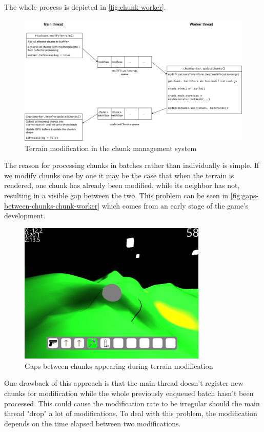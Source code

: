 The whole process is depicted in \autoref{fig:chunk-worker}.
\begin{figure}[h] %
    \centering
    \includegraphics[width=1\textwidth]{chapters/main_components/sections/chunk_worker/resources/chunkWorker.drawio.png}
    \caption{Terrain modification in the chunk management system}
    \label{fig:chunk-worker}
\end{figure}

The reason for processing chunks in batches rather than individually is simple.
If we modify chunks one by one it may be the case that when the terrain is rendered, one chunk has already been modified, while its neighbor has not, resulting in a visible gap between the two.
This problem can be seen in \autoref{fig:gaps-between-chunks-chunk-worker} which comes from an early stage of the game's development.
\begin{figure}[h]
    \centering
    \includegraphics[width=0.8\textwidth]{chapters/main_components/sections/chunk_worker/resources/gaps-between-chunks.png}
    \caption{Gaps between chunks appearing during terrain modification}
    \label{fig:gaps-between-chunks-chunk-worker}
\end{figure}

One drawback of this approach is that the main thread doesn't register new chunks for modification while the whole previously enqueued batch hasn't been processed.
This could cause the modification rate to be irregular should the main thread "drop" a lot of modifications.
To deal with this problem, the modification depends on the time elapsed between two modifications.